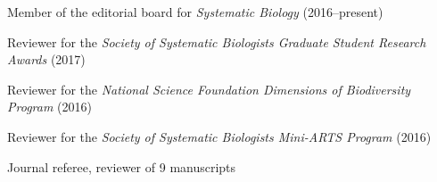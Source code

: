 \begin{tightItemize}
    \item Member of the editorial board for \emph{Systematic Biology}
            (2016--present)
    \item Reviewer for the \emph{Society of Systematic Biologists Graduate
            Student Research Awards} (2017)
    \item Reviewer for the \emph{National Science Foundation Dimensions of
            Biodiversity Program} (2016)
    \item Reviewer for the \emph{Society of Systematic Biologists Mini-ARTS
            Program} (2016)
    \item Journal referee, reviewer of 9 manuscripts
\end{tightItemize}
